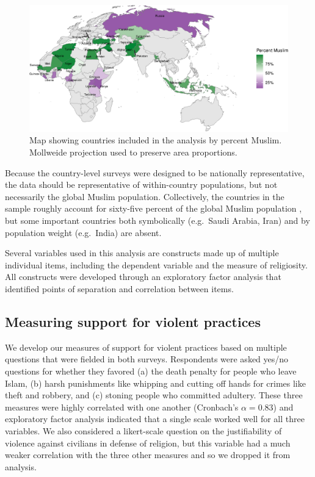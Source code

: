 \documentclass[10pt,letterpaper]{article}
\begin{document}
\begin{figure}[!h]
\begin{adjustwidth}{-2.25in}{0in}
\centering
\includegraphics{figures/fig1.eps}
\caption{Map showing countries included in the analysis by percent
Muslim. Mollweide projection used to preserve area proportions.}
\label{fig1}
\end{adjustwidth}
\end{figure}

Because the country-level surveys were designed to be nationally
representative, the data should be representative of within-country
populations, but not necessarily the global Muslim population.
Collectively, the countries in the sample roughly account for sixty-five
percent of the global Muslim population
\cite{pewforumonreligionandpubliclife_global_2012}, but some important
countries both symbolically (e.g.~Saudi Arabia, Iran) and by population
weight (e.g.~India) are absent.

Several variables used in this analysis are constructs made up of
multiple individual items, including the dependent variable and the
measure of religiosity. All constructs were developed through an
exploratory factor analysis that identified points of separation and
correlation between items.

\subsection*{Measuring support for violent practices}

We develop our measures of support for violent practices based on
multiple questions that were fielded in both surveys. Respondents were
asked yes/no questions for whether they favored (a) the death penalty
for people who leave Islam, (b) harsh punishments like whipping and
cutting off hands for crimes like theft and robbery, and (c) stoning
people who committed adultery. These three measures were highly
correlated with one another (Cronbach's \(\alpha=0.83\)) and exploratory
factor analysis indicated that a single scale worked well for all three
variables. We also considered a likert-scale question on the
justifiability of violence against civilians in defense of religion, but
this variable had a much weaker correlation with the three other
measures and so we dropped it from analysis.
\end{document}
